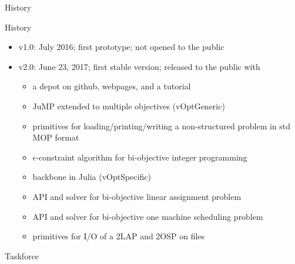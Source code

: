 \documentclass[10pt,xcolor=dvipsnames]{beamer}
\begin{document}
%
% 
\begin{frame}

\begin{center}
{\Large
 \textcolor[RGB]{52,57,176}{
   History
 }
} 
\end{center}
\end{frame}

%
% 
\begin{frame}{History}

\begin{itemize}
  \item v1.0: July 2016; first prototype; not opened to the public
    \medskip
  \item v2.0: June 23, 2017; first stable version;  released to the public with
    \begin{itemize}
       \item a depot on github, webpages, and a tutorial    
       \item JuMP extended to multiple objectives (vOptGeneric)
       \item primitives for loading/printing/writing a non-structured problem in std MOP format
       \item $\epsilon$-constraint algorithm for bi-objective integer programming       
       \item backbone in Julia (vOptSpecific)
       \item API and solver for bi-objective linear assignment problem
       \item API and solver for bi-objective one machine scheduling problem          
       \item primitives for I/O of a 2LAP and 2OSP on files               
    \end{itemize}  
\end{itemize}

\end{frame}

%
% 
\begin{frame}

\begin{center}
{\Large
 \textcolor[RGB]{52,57,176}{
   Taskforce
 }
} 
\end{center}
\end{frame}
\end{document}
